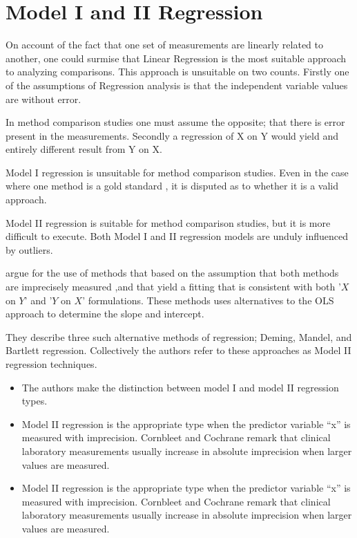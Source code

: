 \documentclass[12pt, a4paper]{report}
\theoremstyle{plain}
\theoremstyle{definition}
\theoremstyle{remark}
\begin{document}
\section{Model I and II Regression}

On account of the fact that one set of measurements are linearly related to another, one could surmise that Linear Regression is the most suitable approach to analyzing comparisons. This approach is unsuitable on two counts. Firstly one of the assumptions of Regression analysis is that the independent variable values are without error. 

In method comparison studies one must assume the opposite; that there is error present in the measurements. Secondly a regression of X on Y would yield and entirely different result from Y on X.

Model I regression is unsuitable for method comparison studies. Even in the case where one method is a gold standard , it is disputed as to whether it is a valid approach. 

Model II regression is suitable for method comparison studies, but it is more difficult to execute. Both Model I and II regression models are unduly influenced by outliers.



\citet{CornCoch} argue for the use of methods that based on
the assumption that both methods are imprecisely measured ,and
that yield a fitting that is consistent with both '$X$ on $Y$' and
'$Y$ on $X$' formulations. These methods uses alternatives to the
OLS approach to determine the slope and intercept.

They describe three such alternative methods of regression; Deming, Mandel, and Bartlett regression. Collectively the authors refer to these approaches as Model II regression techniques.

\begin{itemize}
	\item The authors make the distinction between model I and model II regression types.
	\item Model II regression is the appropriate type when the predictor variable “x” is measured with imprecision.
	Cornbleet and Cochrane remark that clinical laboratory measurements usually increase in absolute imprecision when larger values are measured. %
\end{itemize}

\begin{itemize}
	\item Model II regression is the appropriate type when the predictor variable “x” is measured with imprecision.
	Cornbleet and Cochrane remark that clinical laboratory measurements usually increase in absolute imprecision when larger values are measured. %
\end{itemize}
\end{document}

